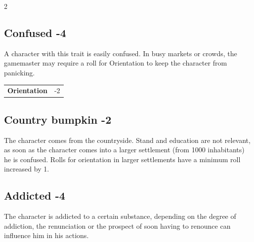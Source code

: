 \begin{multicols}{2}
\begin{tcolorbox}
\end{tcolorbox}

\begin{tcolorbox}
    \subsection*{Confused \hfill \small{-4 }}
    \tcblower
A character with this trait is easily confused. In busy markets or crowds, the gamemaster may require a roll for Orientation to keep the character from panicking.


\vspace{3mm}

\begin{tabular}{@{}ll@{}}
    \textbf{Orientation} & -2\\
\end{tabular}


\end{tcolorbox}

\begin{tcolorbox}
    \subsection*{Country bumpkin \hfill \small{-2 }}
    \tcblower
The character comes from the countryside. Stand and education are not relevant, as soon as the character comes into a larger settlement (from 1000 inhabitants) he is confused. Rolls for orientation in larger settlements have a minimum roll increased by 1.


\vspace{3mm}



\end{tcolorbox}

\begin{tcolorbox}
    \subsection*{Addicted \hfill \small{-4 }}
    \tcblower
The character is addicted to a certain substance, depending on the degree of addiction, the renunciation or the prospect of soon having to renounce can influence him in his actions.



\end{tcolorbox}
\end{multicols}
